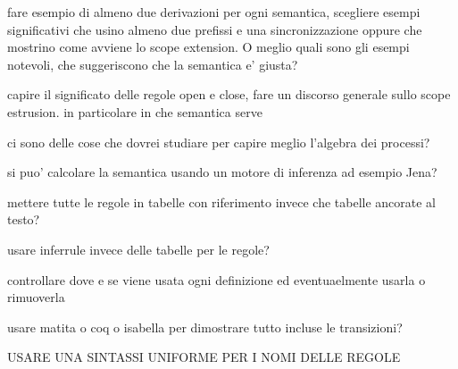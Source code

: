 
fare esempio di almeno due derivazioni per ogni semantica, scegliere esempi significativi che usino almeno due prefissi e una sincronizzazione oppure che mostrino come avviene lo scope extension.
O meglio quali sono gli esempi notevoli, che suggeriscono che la semantica e' giusta?

capire il significato delle regole open e close, fare un discorso generale sullo scope estrusion. in particolare in che semantica serve

ci sono delle cose che dovrei studiare per capire meglio l'algebra dei processi?

si puo' calcolare la semantica usando un motore di inferenza ad esempio Jena?

mettere tutte le regole in tabelle con riferimento invece che tabelle ancorate al testo?

usare inferrule invece delle tabelle per le regole?

controllare dove e se viene usata ogni definizione ed eventuaelmente usarla o rimuoverla

usare matita o coq o isabella per dimostrare tutto incluse le transizioni?



USARE UNA SINTASSI UNIFORME PER I NOMI DELLE REGOLE